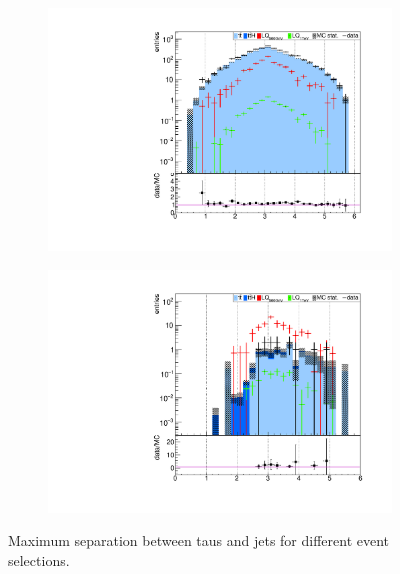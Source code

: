 \begin{figure}
\begin{subfigure}[t]{0.49\textwidth}
                \label{maxdR:taujet:2b2tau}
                \end{subfigure}
                \begin{subfigure}[t]{0.49\textwidth}
                \includegraphics[width=\textwidth]{figures/plots/kinLQ75/maxdR_taujet_2j1b_1tau.pdf}
                \label{maxdR:taujet:1b1tau}
                \end{subfigure}
                \begin{subfigure}[t]{0.49\textwidth}
                \includegraphics[width=\textwidth]{figures/plots/kinLQ75/maxdR_taujet_2j1b_2tau.pdf}
                \label{maxdR:taujet:1b2tau}
                \end{subfigure}
\caption[Maximum separation between taus and jets for different event selections.]{Maximum separation between taus and jets for different event selections.}
\label{maxdR:taujet}
\end{figure}
